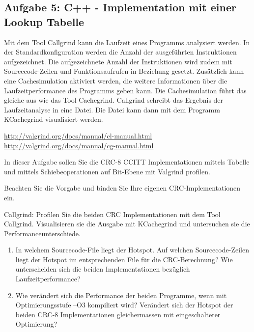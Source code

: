 
\noindent\makebox[\linewidth]{\rule{\paperwidth}{0.4pt}}

\noindent\makebox[\linewidth]{\rule{\paperwidth}{0.4pt}}


\subsection{Aufgabe 5: C++ - Implementation mit einer Lookup Tabelle}

Mit dem Tool Callgrind kann die Laufzeit eines Programms analysiert werden. In der Standardkonfiguration
werden die Anzahl der ausgeführten Instruktionen aufgezeichnet. Die aufgezeichnete Anzahl der Instruktionen
wird zudem mit Sourcecode-Zeilen und Funktionsaufrufen in Beziehung gesetzt. Zusätzlich kann eine
Cachesimulation aktiviert werden, die weitere Informationen über die Laufzeitperformance des Programms
geben kann. Die Cachesimulation führt das gleiche aus wie das Tool Cachegrind. Callgrind schreibt das Ergebnis
der Laufzeitanalyse in eine Datei. Die Datei kann dann mit dem Programm KCachegrind visualisiert
werden.

\url{http://valgrind.org/docs/manual/cl-manual.html}
\url{http://valgrind.org/docs/manual/cg-manual.html}

In dieser Aufgabe sollen Sie die CRC-8 CCITT Implementationen mittels Tabelle und mittels Schiebeoperationen
auf Bit-Ebene mit Valgrind profilen.

Beachten Sie die Vorgabe und binden Sie Ihre eigenen CRC-Implementationen ein.

Callgrind: Profilen Sie die beiden CRC Implementationen mit dem Tool Callgrind. Visualisieren sie die Ausgabe
mit KCachegrind und untersuchen sie die Performanceunterschiede.
\begin{enumerate}
  \item In welchem Sourcecode-File liegt der Hotspot. Auf welchen Sourcecode-Zeilen liegt der Hotspot im
  entsprechenden File für die CRC-Berechnung? Wie unterscheiden sich die beiden Implementationen
  bezüglich Laufzeitperformance?
  \item Wie verändert sich die Performance der beiden Programme, wenn mit Optimierungsstufe –O3 kompiliert
  wird? Verändert sich der Hotspot der beiden CRC-8 Implementationen gleichermassen mit eingeschalteter
  Optimierung?
\end{enumerate}

